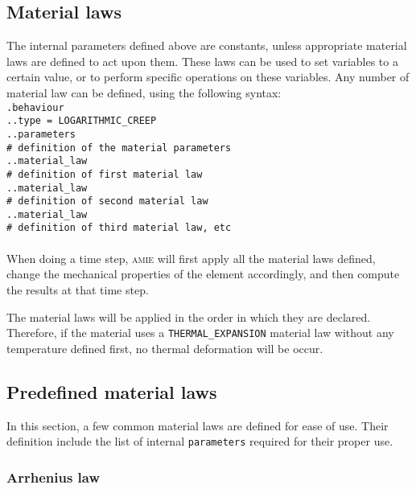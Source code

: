 \documentclass[10pt]{article}
\begin{document}
\subsection{Material laws}

The internal parameters defined above are constants, unless appropriate material laws are defined to act upon them. These laws can be used to set variables to a certain value, or to perform specific operations on these variables. Any number of material law can be defined, using the following syntax:\\

\noindent \verb+.behaviour+\\
\verb+..type = LOGARITHMIC_CREEP+\\
\verb+..parameters+\\
\verb+# definition of the material parameters+\\
\verb+..material_law+\\
\verb+# definition of first material law+\\
\verb+..material_law+\\
\verb+# definition of second material law+\\
\verb+..material_law+\\
\verb+# definition of third material law, etc+

\paragraph{} When doing a time step, \textsc{amie} will first apply all the material laws defined, change the mechanical properties of the element accordingly, and then compute the results at that time step.

The material laws will be applied in the order in which they are declared. Therefore, if the material uses a \verb+THERMAL_EXPANSION+ material law without any temperature defined first, no thermal deformation will be occur.

\subsection{Predefined material laws}

In this section, a few common material laws are defined for ease of use. Their definition include the list of internal \verb+parameters+ required for their proper use.

\subsubsection{Arrhenius law}
\end{document}
